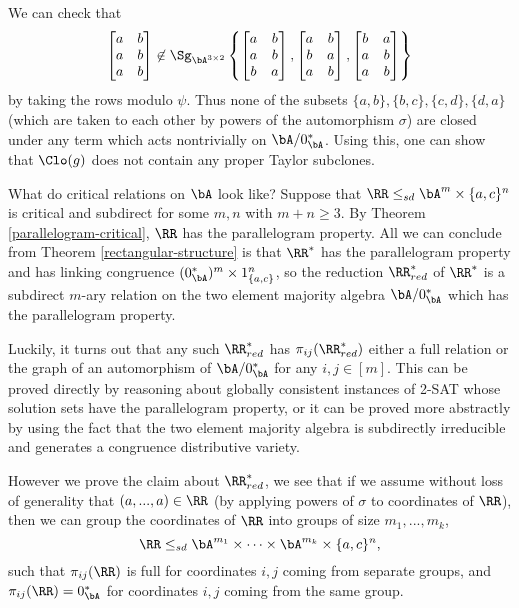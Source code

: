 \begin{ex}
We can check that
\[
\begin{bmatrix} a & b\\ a & b\\ a & b\end{bmatrix} \not\in \Sg_{\bA^{3\times 2}}\left\{\begin{bmatrix} a & b\\ a & b\\ b & a\end{bmatrix}, \begin{bmatrix} a & b\\ b & a\\ a & b\end{bmatrix}, \begin{bmatrix} b & a\\ a & b\\ a & b\end{bmatrix}\right\}
\]
by taking the rows modulo $\psi$. Thus none of the subsets $\{a,b\}, \{b,c\}, \{c,d\}, \{d,a\}$ (which are taken to each other by powers of the automorphism $\sigma$) are closed under any term which acts nontrivially on $\bA/0^*_\bA$. Using this, one can show that $\Clo(g)$ does not contain any proper Taylor subclones.

What do critical relations on $\bA$ look like? Suppose that $\RR \le_{sd} \bA^m\times \{a,c\}^n$ is critical and subdirect for some $m,n$ with $m+n \ge 3$. By Theorem \ref{parallelogram-critical}, $\RR$ has the parallelogram property. All we can conclude from Theorem \ref{rectangular-structure} is that $\RR^*$ has the parallelogram property and has linking congruence $(0^*_\bA)^m\times 1_{\{a,c\}}^n$, so the reduction $\RR^*_{red}$ of $\RR^*$ is a subdirect $m$-ary relation on the two element majority algebra $\bA/0^*_\bA$ which has the parallelogram property.

Luckily, it turns out that any such $\RR^*_{red}$ has $\pi_{ij}(\RR^*_{red})$ either a full relation or the graph of an automorphism of $\bA/0^*_\bA$ for any $i,j \in [m]$. This can be proved directly by reasoning about globally consistent instances of 2-SAT whose solution sets have the parallelogram property, or it can be proved more abstractly by using the fact that the two element majority algebra is subdirectly irreducible and generates a congruence distributive variety.

However we prove the claim about $\RR^*_{red}$, we see that if we assume without loss of generality that $(a,...,a) \in \RR$ (by applying powers of $\sigma$ to coordinates of $\RR$), then we can group the coordinates of $\RR$ into groups of size $m_1, ..., m_k$,
\[
\RR \le_{sd} \bA^{m_1} \times \cdots \times \bA^{m_k} \times \{a,c\}^n,
\]
such that $\pi_{ij}(\RR)$ is full for coordinates $i,j$ coming from separate groups, and $\pi_{ij}(\RR) = 0^*_{\bA}$ for coordinates $i,j$ coming from the same group.


\end{ex}
